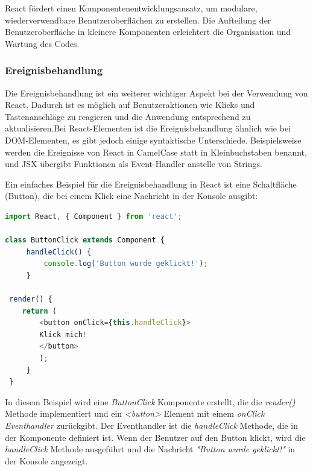 React fördert einen Komponentenentwicklungsansatz, um modulare, wiederverwendbare Benutzeroberflächen zu erstellen. Die Aufteilung der Benutzeroberfläche in kleinere Komponenten erleichtert die Organisation und Wartung des Codes.

\subsubsection{Ereignisbehandlung}
Die Ereignisbehandlung ist ein weiterer wichtiger Aspekt bei der Verwendung von React. Dadurch ist es möglich auf Benutzeraktionen wie Klicks und Tastenanschläge zu reagieren und die Anwendung entsprechend zu aktualisieren.Bei React-Elementen ist die Ereignisbehandlung ähnlich wie bei DOM-Elementen, es gibt jedoch einige syntaktische Unterschiede. Beispielsweise werden die Ereignisse von React in CamelCase statt in Kleinbuchstaben benannt, und JSX übergibt Funktionen als Event-Handler anstelle von Strings.\cite{react_de_handling_events}

Ein einfaches Beispiel für die Ereignisbehandlung in React ist eine Schaltfläche (Button), die bei einem Klick eine Nachricht in der Konsole ausgibt:\newpage

\begin{lstlisting}[language=JavaScript,
	frame=single,           % Ein Rahmen um den Code
	framexleftmargin=15pt,  % Rahmen link von den Zahlen
	style=algoBericht,
	label={Events},
	captionpos=b ,          % Caption unter den Code setzen
	caption={Beispiel EventHandler}]
import React, { Component } from 'react';

class ButtonClick extends Component {
     handleClick() {
         console.log('Button wurde geklickt!');
     }
 
 render() {
 	return (
 	    <button onClick={this.handleClick}>
 	    Klick mich!
 	    </button>
 	    );
     }
 }

\end{lstlisting}

In diesem Beispiel wird eine \emph{ButtonClick} Komponente erstellt, die die \emph{render()} Methode implementiert und ein \emph{<button>} Element mit einem \emph{onClick Eventhandler} zurückgibt. Der Eventhandler ist die \emph{handleClick} Methode, die in der Komponente definiert ist. Wenn der Benutzer auf den Button klickt, wird die \emph{handleClick} Methode ausgeführt und die Nachricht \emph{"Button wurde geklickt!"} in der Konsole angezeigt.\cite{react_de_handling_events}\\

